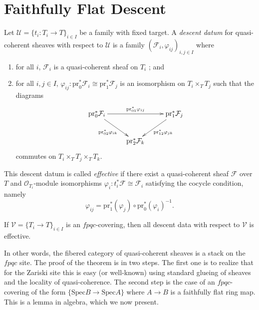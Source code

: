 \section{Faithfully Flat Descent}
\label{section-fpqc-descent}

\begin{definition}
Let $\mathcal{U} = \{ t_i : T_i \to T\}_{i \in I}$ be a family with fixed 
target. A \emph{descent datum} for quasi-coherent sheaves with respect to 
$\mathcal{U}$ is a family $(\mathcal{F}_i, \varphi_{ij})_{i,j\in I}$ where
\begin{enumerate}
\item for all $i$, $\mathcal{F}_i$ is a quasi-coherent sheaf on $T_i$ ; and
\item for all $i, j \in I$, $\varphi_{ij} : \text{pr}_0^* \mathcal{F}_i \cong 
\text{pr}_1^* \mathcal{F}_j$ is an isomorphism on $T_i \times_T T_j$ such that 
the diagrams
$$
\xymatrix{
{\text{pr}_0^* \mathcal{F}_i} \ar_{\text{pr}_{02}^*\varphi_{ik}}[dr] 
\ar^{\text{pr}_{01}^*\varphi_{ij}}[rr] & & {\text{pr}_1^* 
\mathcal{F}_j}\ar^{\text{pr}_{12}^*\varphi_{jk}}[dl] \\
& {\text{pr}_2^* \mathcal{F}_k}  
}
$$ 
commutes on $T_i \times_T T_j \times_T T_k$.
\end{enumerate}

\noindent
This descent datum is called \emph{effective} if there exist a quasi-coherent 
sheaf $\mathcal{F}$ over $T$ and $\mathcal{O}_{T_i}$-module isomorphisms 
$\varphi_i : t_i^* \mathcal{F} \cong \mathcal{F}_i$ satisfying the cocycle 
condition, namely
$$
\varphi_{ij} = \text{pr}_1^* (\varphi_j) \circ \text{pr}_0^* (\varphi_i)^{-1}.
$$ 
\end{definition}

\begin{theorem} \label{thm:DescentIsEffectiveForQCoh}
If $\mathcal{V} = \{T_i \to T\}_{i\in I}$ is an $fpqc$-covering, then all 
descent data with respect to $\mathcal{V}$ is effective.
\end{theorem}

\noindent
In other words, the fibered category of quasi-coherent sheaves is a stack on 
the $fpqc$ site.
The proof of the theorem is in two steps. The first one is to realize that for 
the Zariski site this is easy (or well-known) using standard glueing of sheaves 
and the locality of quasi-coherence. The second step is the case of an 
$fpqc$-covering of the form $\{ \text{Spec} B \to \text{Spec} A\}$ where $A \to 
B$ is a faithfully flat ring map. This is a lemma in algebra, which we now 
present.

